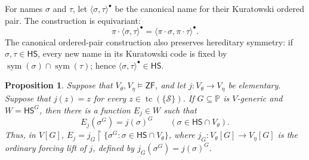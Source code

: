 \documentclass[11pt,a4paper]{amsart}
\newcommand{\ZF}{\mathsf{ZF}}
\newcommand{\HS}{\mathsf{HS}}
\newcommand{\sym}{\operatorname{sym}}
\newcommand{\tc}{\operatorname{tc}}
\newcommand{\restr}{\mathbin{\upharpoonright}}
\theoremstyle{plain}
\newtheorem{proposition}[theorem]{Proposition}
\theoremstyle{definition}
\theoremstyle{remark}
\begin{document}
For names $\sigma$ and $\tau$, let $\langle\sigma,\tau\rangle^\bullet$ be the canonical name for their Kuratowski ordered pair.  The construction is equivariant:
\[
\pi\cdot\langle\sigma,\tau\rangle^\bullet
=\langle\pi\cdot\sigma,\pi\cdot\tau\rangle^\bullet.
\]
{The canonical ordered-pair construction also preserves hereditary symmetry: if $\sigma,\tau\in\HS$, every new name in its Kuratowski code is fixed by $\sym(\sigma)\cap\sym(\tau)$; hence $\langle\sigma,\tau\rangle^\bullet\in\HS$.}

\begin{proposition}\label{prop:symmetric-lift}
Suppose that $V_\theta,V_\eta\models\ZF$, and let $j:V_\theta\to V_\eta$ be elementary.  Suppose that $j(z)=z$ for every $z\in\tc(\{\mathscr S\})$.  If $G\subseteq\mathbb P$ is $V$-generic and $W=\HS^G$, then there is a function $E_j\in W$ such that
\[
E_j(\sigma^G)=j(\sigma)^G\qquad(\sigma\in\HS\cap V_\theta).
\]
Thus, in $V[G]$, $E_j=j_G\restr\{\sigma^G:\sigma\in\HS\cap V_\theta\}$, where $j_G:V_\theta[G]\to V_\eta[G]$ is the ordinary forcing lift of $j$, defined by $j_G(\sigma^G)=j(\sigma)^G$.
\end{proposition}
\end{document}
